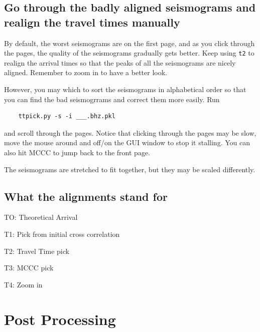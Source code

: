 \documentclass[letterpaper,10pt]{article}
\begin{document}

\subsection{Go through the badly aligned seismograms and realign the travel times manually}

By default, the worst seismograms are on the first page, and as you click through the pages, the quality of the seismograms gradually gets better. Keep using \texttt{t2} to realign the arrival times so that the peaks of all the seismograms are nicely aligned. Remember to zoom in to have a better look.

However, you may which to sort the seismograms in alphabetical order so that you can find the bad seismogrrams and correct them more easily. Run 

\begin{verbatim}
	ttpick.py -s -i ___.bhz.pkl
\end{verbatim}

and scroll through the pages. Notice that clicking through the pages may be slow, move the mouse around and off/on the GUI window to stop it stalling. You can also hit MCCC to jump back to the front page. 

The seismograms are stretched to fit together, but they may be scaled differently. 


\subsection{What the alignments stand for}

TO: Theoretical Arrival

T1: Pick from initial cross correlation

T2: Travel Time pick

T3: MCCC pick

T4: Zoom in


\section{Post Processing}
\end{document}
